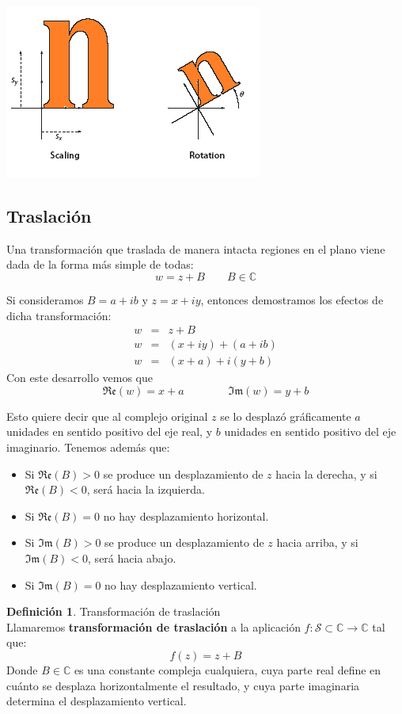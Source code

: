 \documentclass[12pt]{article}
\theoremstyle{definition}
\newtheorem{definition}{Definici\'on}[section]
\theoremstyle{theorem}
\theoremstyle{corolary}
\begin{document}
\begin{center}
	\includegraphics[scale=1]{scale_rot.png}
\end{center}


\subsection{Traslaci\'on}
Una transformaci\'on que traslada de manera intacta regiones en el plano viene dada de la forma m\'as simple de todas: $$w = z + B \qquad B \in \mathbb{C}$$

Si consideramos $B = a + ib$ y $z = x + iy$, entonces demostramos los efectos de dicha transformaci\'on:
\begin{eqnarray*}
w &=& z + B\\
w &=& (x + iy) + (a + ib)\\
w &=& (x + a) + i(y + b)
\end{eqnarray*}
Con este desarrollo vemos que $$\mathfrak{Re}(w) = x+a \qquad \qquad \mathfrak{Im}(w)=y+b$$

Esto quiere decir que al complejo original $z$ se lo desplaz\'o gr\'aficamente $a$ unidades en sentido positivo del eje real, y $b$ unidades en sentido positivo del eje imaginario. Tenemos adem\'as que:
\begin{itemize}
	\item Si $\mathfrak{Re}(B) > 0$ se produce un desplazamiento de $z$ hacia la derecha, y si  $\mathfrak{Re}(B) < 0$, ser\'a hacia la izquierda.
	\item Si $\mathfrak{Re}(B) = 0$ no hay desplazamiento horizontal.
	\item Si $\mathfrak{Im}(B) > 0$ se produce un desplazamiento de $z$ hacia arriba, y si  $\mathfrak{Im}(B) < 0$, ser\'a hacia abajo.
	\item Si $\mathfrak{Im}(B) = 0$ no hay desplazamiento vertical.
\end{itemize}


\colorbox{green!40!white!80}{\parbox{\linewidth}{
 \theoremstyle{definition}
 \begin{definition}{Transformaci\'on de traslaci\'on}\\
  	Llamaremos \textbf{transformaci\'on de traslaci\'on} a la aplicaci\'on $f: \mathcal{S} \subset \mathbb{C} \rightarrow \mathbb{C}$ tal que: $$f(z) = z+B$$ Donde $B \in \mathbb{C}$ es una constante compleja cualquiera, cuya parte real define en cu\'anto se desplaza horizontalmente el resultado, y cuya parte imaginaria determina el desplazamiento vertical.
 \end{definition}}}
\linebreak
\end{document}
